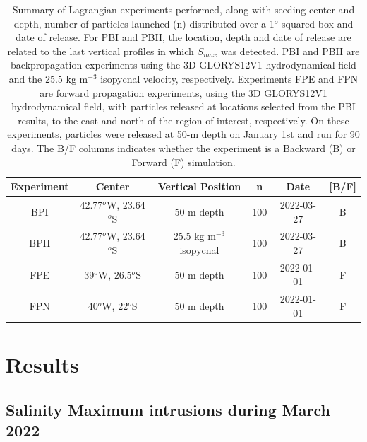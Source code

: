 \documentclass[draft]{agujournal2019}
\begin{document}
\begin{table}[ht!]
\caption{Summary of Lagrangian experiments performed, along with seeding center and depth, number of particles launched (n) distributed over a 1$^o$ squared box and date of release. For PBI and PBII, the location, depth and date of release are related to the last vertical profiles in which \textit{$S_{max}$} was detected. PBI and PBII are backpropagation experiments using the 3D GLORYS12V1 hydrodynamical field and the 25.5 kg m$^{-3}$ isopycnal velocity, respectively. Experiments FPE and FPN are forward propagation experiments, using the 3D GLORYS12V1 hydrodynamical field, with particles released at locations selected from the PBI results, to the east and north of the region of interest, respectively. On these experiments, particles were released at 50-m depth on January 1st and run for 90 days. The B/F columns indicates whether the experiment is a Backward (B) or Forward (F) simulation.}
\label{tab:lagrangian_experiments}
\begin{tabular}{c c c c c c}
\hline
\textbf{Experiment} & \textbf{Center} & \textbf{Vertical Position} & \textbf{n} & \textbf{Date} & \textbf{{[}B/F{]}} \\
\hline
BPI                  & 42.77$^o$W, 23.64$^o$S & 50 m depth                     & 100          & 2022-03-27 & B    \\ 
BPII                 & 42.77$^o$W, 23.64$^o$S & 25.5 kg m$^{-3}$ isopycnal                      & 100         & 2022-03-27 & B     \\ 
FPE                  & 39$^o$W, 26.5$^o$S & 50 m depth                     & 100          & 2022-01-01 & F    \\ 
FPN                  & 40$^o$W, 22$^o$S & 50 m depth                     & 100          & 2022-01-01 & F     \\ 
\hline
\end{tabular}
\end{table}

\section{Results}
\label{section:description}

\subsection{Salinity Maximum intrusions during March 2022}
\label{subsec:smaxdesc}
\end{document}
